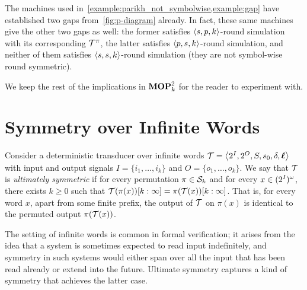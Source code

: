 The machines used in~\cref{example:parikh_not_symbolwise,example:gap} have established two gaps from~\cref{fig:p-diagram} already. In fact, these same machines give the other two gaps as well: the former satisfies $\left< s,p,k\right>$-round simulation with its corresponding $\mathcal{T}^\pi$, the latter satisfies $\left< p,s,k\right>$-round simulation, and neither of them satisfies $\left< s,s,k\right>$-round simulation (they are not symbol-wise round symmetric).

We keep the rest of the implications in $\mathbf{MOP}^2_k$ for the reader to experiment with.

\section{Symmetry over Infinite Words}

Consider a deterministic transducer over infinite words $\mathcal{T}=\left< 2^{I},2^{O},S,s_0,\delta,\boldsymbol{\ell}\right>$ with input and output signals $I=\{i_1,\ldots,i_k\}$ and $O=\{o_1,\ldots,o_k\}$. We say that $\mathcal{T}$ is \emph{ultimately symmetric} if for every permutation $\pi\in \mathcal{S}_k$ and for every $x\in (2^{I})^\omega$, there exists $k\ge 0$ such that $\mathcal{T}(\pi(x))[k:\infty]=\pi(\mathcal{T}(x))[k:\infty]$. That is, for every word $x$, apart from some finite prefix, the output of $\mathcal{T}$ on $\pi(x)$ is identical to the permuted output $\pi(\mathcal{T}(x))$.

The setting of infinite words is common in formal verification; it arises from the idea that a system is sometimes expected to read input indefinitely, and symmetry in such systems would either span over all the input that has been read already or extend into the future. Ultimate symmetry captures a kind of symmetry that achieves the latter case.

